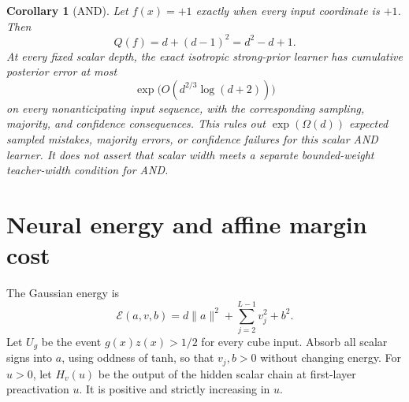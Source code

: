 \documentclass[11pt]{article}
\newtheorem{corollary}[theorem]{Corollary}
\begin{document}
\begin{corollary}[AND]\label{cor:and}
Let $f(x)=+1$ exactly when every input coordinate is $+1$. Then
\[
 Q(f)=d+(d-1)^2=d^2-d+1.
\]
At every fixed scalar depth, the exact isotropic strong-prior learner has cumulative posterior error at most
\[
 \exp\bigl(O(d^{2/3}\log(d+2))\bigr)
\]
on every nonanticipating input sequence, with the corresponding sampling, majority, and confidence consequences. This rules out $\exp(\Omega(d))$ expected sampled mistakes, majority errors, or confidence failures for this scalar AND learner. It does not assert that scalar width meets a separate bounded-weight teacher-width condition for AND.
\end{corollary}

\section{Neural energy and affine margin cost}
The Gaussian energy is
\[
 \mathcal E(a,v,b)=d\|a\|^2+\sum_{j=2}^{L-1}v_j^2+b^2.
\]
Let $U_g$ be the event $g(x)z(x)>1/2$ for every cube input. Absorb all scalar signs into $a$, using oddness of tanh, so that $v_j,b>0$ without changing energy. For $u>0$, let $H_v(u)$ be the output of the hidden scalar chain at first-layer preactivation $u$. It is positive and strictly increasing in $u$.
\end{document}
